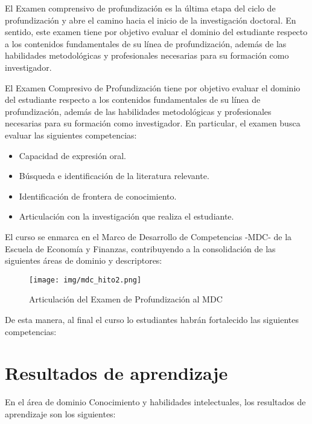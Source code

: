 El Examen comprensivo de profundización es la última etapa del ciclo de profundización y abre el camino hacia el inicio de la investigación doctoral. En sentido, este examen tiene por objetivo evaluar el dominio del estudiante respecto a los contenidos fundamentales de su línea de profundización, además de las habilidades metodológicas y profesionales necesarias para su formación como investigador.

El Examen Compresivo de Profundización tiene por objetivo evaluar el dominio del estudiante respecto a los contenidos fundamentales de su línea de profundización, además de las habilidades metodológicas y profesionales necesarias para su formación como investigador. En particular, el examen busca evaluar las siguientes competencias:

\begin{itemize}
    \item Capacidad de expresión oral.
    \item Búsqueda e identificación de la literatura relevante.
    \item Identificación de frontera de conocimiento.
    \item Articulación con la investigación que realiza el estudiante.
\end{itemize}

El curso se enmarca en el Marco de Desarrollo de Competencias -MDC- de la Escuela de Economía y Finanzas, contribuyendo a la consolidación de las siguientes áreas de dominio y descriptores:

\begin{figure}[H]
\caption{Articulación del Examen de Profundización al  MDC \label{hito1_mdc} }
\begin{center}
\texttt{[image: img/mdc\_hito2.png]}
\end{center}
\end{figure}

De esta manera, al final el curso lo estudiantes habrán fortalecido las siguientes competencias:
 
\section{Resultados de aprendizaje}

En el área de dominio Conocimiento y habilidades intelectuales, los resultados de aprendizaje son los siguientes:

